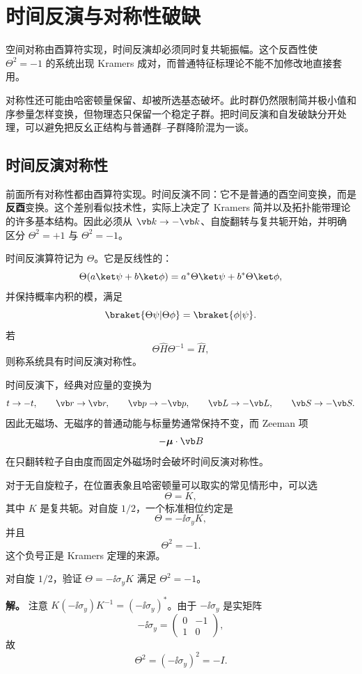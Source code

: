 \section{时间反演与对称性破缺}
\label{chap:time-reversal-breaking}

空间对称由酉算符实现，时间反演却必须同时复共轭振幅。这个反酉性使 $\Theta^2=-1$ 的系统出现 Kramers 成对，而普通特征标理论不能不加修改地直接套用。

对称性还可能由哈密顿量保留、却被所选基态破坏。此时群仍然限制简并极小值和序参量怎样变换，但物理态只保留一个稳定子群。把时间反演和自发破缺分开处理，可以避免把反幺正结构与普通群--子群降阶混为一谈。


\subsection{时间反演对称性}
\label{sec:time-reversal}

前面所有对称性都由酉算符实现。时间反演不同：它不是普通的酉空间变换，而是\textbf{反酉}变换。这个差别看似技术性，实际上决定了 Kramers 简并以及拓扑能带理论的许多基本结构。因此必须从 $\vb k\to-\vb k$、自旋翻转与复共轭开始，并明确区分 $\Theta^2=+1$ 与 $\Theta^2=-1$。


\begin{definition}[时间反演算符]
时间反演算符记为 $\Theta$。它是反线性的：
\[
\Theta(a\ket\psi+b\ket\phi)
=a^*\Theta\ket\psi+b^*\Theta\ket\phi,
\]
并保持概率内积的模，满足
\[
\braket{\Theta\psi|\Theta\phi}
=\braket{\phi|\psi}.
\]
若
\[
\Theta\hat H\Theta^{-1}=\hat H,
\]
则称系统具有时间反演对称性。
\label{def:time-reversal}
\end{definition}

时间反演下，经典对应量的变换为
\[
 t\to-t,
\qquad
\vb r\to\vb r,
\qquad
\vb p\to-\vb p,
\qquad
\vb L\to-\vb L,
\qquad
\vb S\to-\vb S.
\]
因此无磁场、无磁序的普通动能与标量势通常保持不变，而 Zeeman 项
\[
-\boldsymbol\mu\cdot\vb B
\]
在只翻转粒子自由度而固定外磁场时会破坏时间反演对称性。

对于无自旋粒子，在位置表象且哈密顿量可以取实的常见情形中，可以选
\[
\Theta=K,
\]
其中 $K$ 是复共轭。对自旋 $1/2$，一个标准相位约定是
\[
\Theta=-\ii\sigma_yK,
\label{eq:spin-half-time-reversal}
\]
并且
\[
\Theta^2=-1.
\label{eq:theta-square-minus}
\]
这个负号正是 Kramers 定理的来源。

\begin{workedexample}
对自旋 $1/2$，验证 $\Theta=-\ii\sigma_yK$ 满足 $\Theta^2=-1$。

\textbf{解。} 注意 $K(-\ii\sigma_y)K^{-1}=(-\ii\sigma_y)^*$。由于 $-\ii\sigma_y$ 是实矩阵
\[
-\ii\sigma_y=\begin{pmatrix}0&-1\\1&0\end{pmatrix},
\]
故
\[
\Theta^2=(-\ii\sigma_y)^2=-I.
\]
\end{workedexample}


